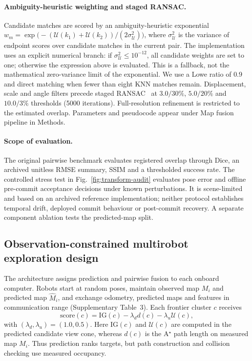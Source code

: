 \documentclass[11pt]{article}
\begin{document}
\paragraph{Ambiguity-heuristic weighting and staged RANSAC.}
Candidate matches are scored by an ambiguity-heuristic exponential
$w_m=\exp\!\bigl(-(\mathcal{U}(k_1)+\mathcal{U}(k_2))/(2\sigma_{\mathcal{U}}^{2})\bigr)$,
where $\sigma_{\mathcal U}^{2}$ is the variance of endpoint scores over candidate matches in the current pair. The implementation uses an explicit numerical branch: if $\sigma_{\mathcal U}^{2}\leq10^{-12}$, all candidate weights are set to one; otherwise the expression above is evaluated. This is a fallback, not the mathematical zero-variance limit of the exponential. We use a Lowe ratio of $0.9$ and direct matching when fewer than eight KNN matches remain. Displacement, scale and angle filters precede staged RANSAC~\citep{fischler1981random} at $3.0/30\%$, $5.0/20\%$ and $10.0/3\%$ thresholds (5000 iterations). Full-resolution refinement is restricted to the estimated overlap. Parameters and pseudocode appear under Map fusion pipeline in Methods.

\paragraph{Scope of evaluation.}
The original pairwise benchmark evaluates registered overlap through Dice, an archived unitless RMSE summary, SSIM and a thresholded success rate. The controlled stress test in Fig.~\ref{fig:transform-audit} evaluates pose error and offline pre-commit acceptance decisions under known perturbations. It is scene-limited and based on an archived reference implementation; neither protocol establishes temporal drift, deployed commit behaviour or post-commit recovery. A separate component ablation tests the predicted-map split.

\subsection{Observation-constrained multirobot exploration design} \label{sec::multirobot-exploration}
The architecture assigns prediction and pairwise fusion to each onboard computer. Robots start at random poses, maintain observed map $M_i$ and predicted map $\hat{M}_i$, and exchange odometry, predicted maps and features in communication range (Supplementary Table~3). Each frontier cluster $c$ receives
\[
\mathrm{score}(c)=\mathrm{IG}(c)-\lambda_{d}d(c)-\lambda_{u}\mathcal{U}(c),
\]
with $(\lambda_{d},\lambda_{u})=(1.0,0.5)$. Here $\mathrm{IG}(c)$ and $\mathcal{U}(c)$ are computed in the predicted candidate view cone, whereas $d(c)$ is the A$^\star$ path length on measured map $M_i$. Thus prediction ranks targets, but path construction and collision checking use measured occupancy.
\end{document}
